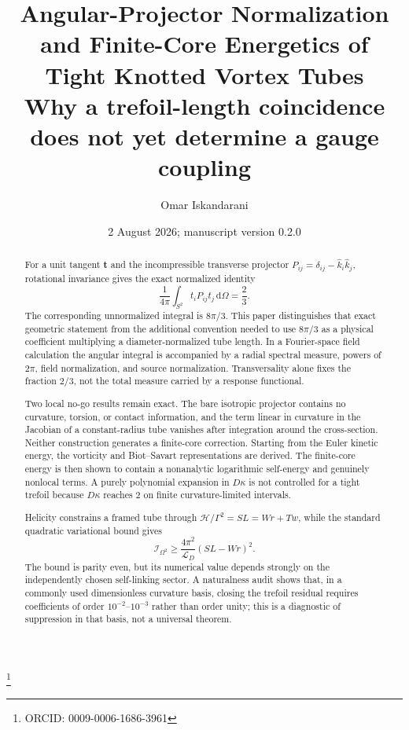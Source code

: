 \documentclass[aps,pre,preprint,notitlepage,nofootinbib,superscriptaddress]{revtex4-2}
\newcommand{\dd}{\mathrm d}
\begin{document}
\title{\texorpdfstring{Angular-Projector Normalization and Finite-Core Energetics of Tight Knotted Vortex Tubes\\\large Why a trefoil-length coincidence does not yet determine a gauge coupling}{Angular-Projector Normalization and Finite-Core Energetics of Tight Knotted Vortex Tubes: Why a trefoil-length coincidence does not yet determine a gauge coupling}}

\author{Omar Iskandarani}
\thanks{ORCID: 0009-0006-1686-3961}
\date{2 August 2026; manuscript version 0.2.0}

\begin{abstract}
For a unit tangent $\bm t$ and the incompressible transverse projector $P_{ij}=\delta_{ij}-\widehat{k}_i\widehat{k}_j$, rotational invariance gives the exact normalized identity
\[
\frac{1}{4\pi}\int_{S^2}t_iP_{ij}t_j\,\dd\Omega=\frac23.
\]
The corresponding unnormalized integral is $8\pi/3$.  This paper distinguishes that exact geometric statement from the additional convention needed to use $8\pi/3$ as a physical coefficient multiplying a diameter-normalized tube length.  In a Fourier-space field calculation the angular integral is accompanied by a radial spectral measure, powers of $2\pi$, field normalization, and source normalization.  Transversality alone fixes the fraction $2/3$, not the total measure carried by a response functional.

Two local no-go results remain exact.  The bare isotropic projector contains no curvature, torsion, or contact information, and the term linear in curvature in the Jacobian of a constant-radius tube vanishes after integration around the cross-section.  Neither construction generates a finite-core correction.  Starting from the Euler kinetic energy, the vorticity and Biot--Savart representations are derived.  The finite-core energy is then shown to contain a nonanalytic logarithmic self-energy and genuinely nonlocal terms.  A purely polynomial expansion in $D\kappa$ is not controlled for a tight trefoil because $D\kappa$ reaches $2$ on finite curvature-limited intervals.

Helicity constrains a framed tube through $\mathcal H/\Gamma^2=SL=Wr+Tw$, while the standard quadratic variational bound gives
\[
\mathcal I_{\Omega^2}\geq \frac{4\pi^2}{\mathcal L_D}(SL-Wr)^2.
\]
The bound is parity even, but its numerical value depends strongly on the independently chosen self-linking sector.  A naturalness audit shows that, in a commonly used dimensionless curvature basis, closing the trefoil residual requires coefficients of order $10^{-2}$--$10^{-3}$ rather than order unity; this is a diagnostic of suppression in that basis, not a universal theorem.


\end{abstract}
\end{document}
